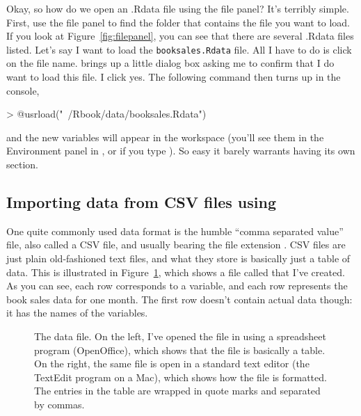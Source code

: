 Okay, so how do we open an .Rdata file using the \Rstudio file panel? It's terribly simple. First, use the file panel to find the folder that contains the file you want to load. If you look at Figure~\ref{fig:filepanel}, you can see that there are several .Rdata files listed. Let's say I want to load the \texttt{booksales.Rdata} file. All I have to do is click on the file name. \Rstudio brings up a little dialog box asking me to confirm that I do want to load this file. I click yes. The following command then turns up in the console,
\begin{rblock1}
> @usr{load("~/Rbook/data/booksales.Rdata")}
\end{rblock1}
and the new variables will appear in the workspace (you'll see them in the Environment panel in \Rstudio, or if you type ). So easy it barely warrants having its own section.


\subsection{Importing data from CSV files using \R\label{sec:loadingcsv}}

One quite commonly used data format is the humble ``comma separated value'' file, also called a CSV file, and usually bearing the file extension . CSV files are just plain old-fashioned text files, and what they store is basically just a table of data. This is illustrated in Figure~\ref{fig:booksalescsv}, which shows a file called  that I've created. As you can see, each row corresponds to a variable, and each row represents the book sales data for one month. The first row doesn't contain actual data though: it has the names of the variables.

\begin{figure}[H]
\begin{center}
\caption{The  data file. On the left, I've opened the file in using a spreadsheet program (OpenOffice), which shows that the file is basically a table. On the right, the same file is open in a standard text editor (the TextEdit program on a Mac), which shows how the file is formatted. The entries in the table are wrapped in quote marks and separated by commas.}
\label{fig:booksalescsv}
\end{center}
\end{figure} 

